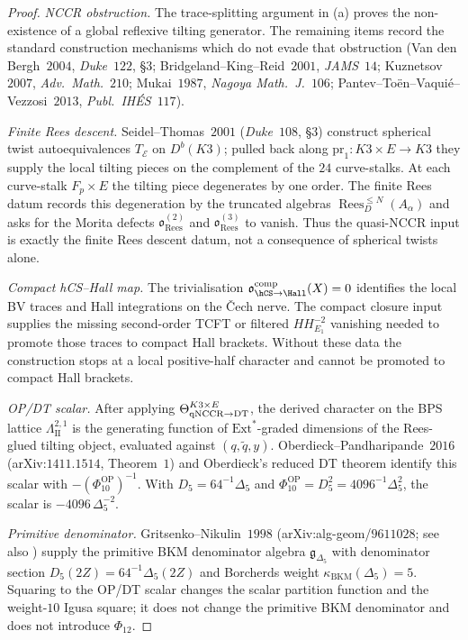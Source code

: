 \begin{proof}
\emph{NCCR obstruction.} The trace-splitting argument in (a) proves the
non-existence of a global reflexive tilting generator. The remaining
items record the standard construction mechanisms which do not evade
that obstruction (Van den Bergh~$2004$, \emph{Duke}~$122$, \S$3$;
Bridgeland--King--Reid~$2001$, \emph{JAMS}~$14$; Kuznetsov~$2007$,
\emph{Adv.\ Math.}~$210$; Mukai~$1987$, \emph{Nagoya Math.\ J.}~$106$;
Pantev--To\"en--Vaqui\'e--Vezzosi~$2013$, \emph{Publ.\ IH\'ES}~$117$).

\emph{Finite Rees descent.} Seidel--Thomas~$2001$ (\emph{Duke}~$108$,
\S$3$) construct spherical twist autoequivalences $T_\mathcal{E}$ on
$D^b(K3)$; pulled back along $\mathrm{pr}_1 \colon K3 \times E \to K3$
they supply the local tilting pieces on the complement of the $24$
curve-stalks. At each curve-stalk $F_p \times E$ the tilting piece
degenerates by one order. The finite Rees datum records this degeneration
by the truncated algebras $\operatorname{Rees}^{\leq N}_{D}(A_\alpha)$
and asks for the Morita defects $\mathfrak o_{\mathrm{Rees}}^{(2)}$ and
$\mathfrak o_{\mathrm{Rees}}^{(3)}$ to vanish. Thus the quasi-NCCR input
is exactly the finite Rees descent datum, not a consequence of spherical
twists alone.

\emph{Compact hCS--Hall map.} The trivialisation
$\mathfrak o_{\hCS\to\Hall}^{\mathrm{comp}}(X)=0$ identifies the local
BV traces and Hall integrations on the \v{C}ech nerve. The compact
closure input supplies the missing second-order TCFT or filtered
$HH^{-2}_{E_1}$ vanishing needed to promote those traces to compact Hall
brackets. Without these data the construction stops at a local
positive-half character and cannot be promoted to compact Hall brackets.

\emph{OP/DT scalar.} After applying $\Theta_{\mathrm{qNCCR}\to\mathrm{DT}}^{K3\times E}$, the derived
character on the BPS lattice $\Lambda^{2, 1}_{\mathrm{II}}$ is the
generating function of $\mathrm{Ext}^*$-graded dimensions of the
Rees-glued tilting object, evaluated against $(q,\tilde q,y)$.
Oberdieck--Pandharipande~$2016$ (arXiv:$1411.1514$, Theorem~$1$) and
Oberdieck's reduced DT theorem identify this scalar with
$-(\Phi_{10}^{\mathrm{OP}})^{-1}$. With $D_5=64^{-1}\Delta_5$ and
$\Phi_{10}^{\mathrm{OP}}=D_5^2=4096^{-1}\Delta_5^2$, the scalar is
$-4096\,\Delta_5^{-2}$.

\emph{Primitive denominator.} Gritsenko--Nikulin~$1998$
(arXiv:alg-geom/$9611028$; see also \cite{GritsenkoNikulin1998})
supply the primitive BKM denominator algebra $\mathfrak g_{\Delta_5}$
with denominator section $D_5(2Z)=64^{-1}\Delta_5(2Z)$ and Borcherds
weight $\kappa_{\mathrm{BKM}}(\Delta_5)=5$. Squaring to
the OP/DT scalar changes the scalar partition function and the
weight-$10$ Igusa square; it does not change the primitive BKM
denominator and does not introduce $\Phi_{12}$.
\end{proof}

